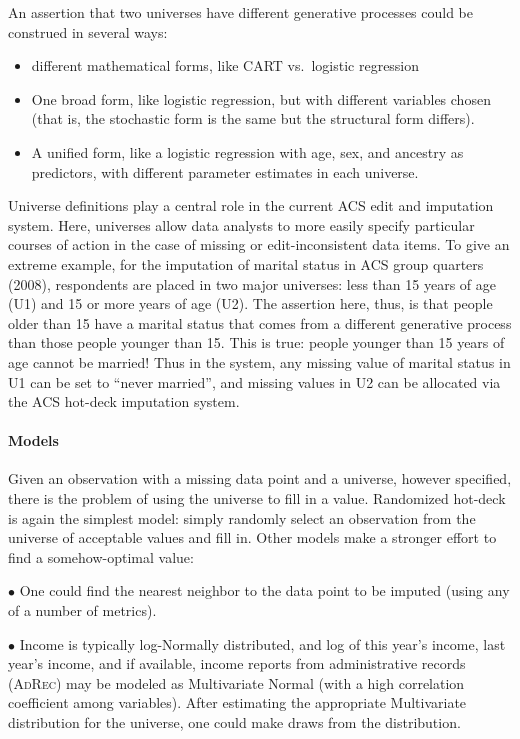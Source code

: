\documentclass{article}
\def\tighten{ \setlength{\itemsep}{1pt}
    \setlength{\parskip}{0pt}}
\def\adrec{\textsc{AdRec}\xspace}
\begin{document}
An assertion that two universes have different generative processes could be construed in
several ways:
\begin{itemize}\tighten
\item different mathematical forms, like CART vs.\ logistic regression
\item One broad form, like logistic regression, but with different variables chosen
    (that is, the stochastic form is the same but the structural form differs).
\item A unified form, like a logistic regression with age, sex, and ancestry
    as predictors, with different parameter estimates in each universe.
\end{itemize}

Universe definitions play a central role in the current ACS edit and imputation system.
Here, universes allow data analysts to more easily specify particular courses of
action in the case of missing or edit-inconsistent data items. To give an extreme example, for the
imputation of marital status in ACS group quarters (2008), respondents are placed
in two major universes: less than 15 years of age (U1) and 15 or more years of age
(U2). The assertion here, thus, is that people older than 15 have a marital status
that comes from a different generative process than those people younger than 15.
This is true: people younger than 15 years of age cannot be married!  Thus in the
system, any missing value of marital status in U1 can be set to ``never married'',
and missing values in U2 can be allocated via the ACS hot-deck imputation system.


\paragraph{Models}

Given an observation with a missing data point and a universe, however specified, there is
the problem of using the universe to fill in a value. Randomized hot-deck is again
the simplest model: simply randomly select an observation from the universe of acceptable
values and fill in. Other models make a stronger effort to find a somehow-optimal value:

$\bullet$ One could find the nearest neighbor to the data point to be imputed (using any
of a number of metrics).

$\bullet$ Income is typically log-Normally distributed, and log of this year's income, last
year's income, and if available, income reports from administrative records (\adrec) may 
be modeled as Multivariate Normal (with a high correlation
coefficient among variables). After estimating the appropriate Multivariate
distribution for the universe, one could make draws from the distribution.
\end{document}
